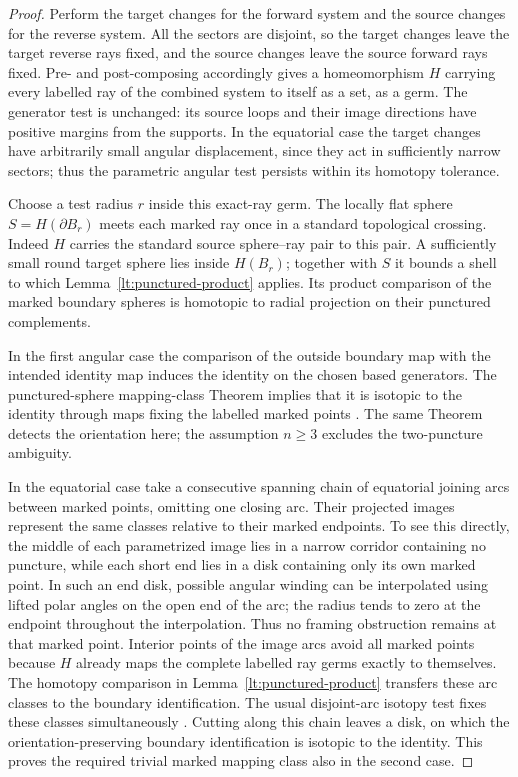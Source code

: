 \documentclass[11pt]{article}
\numberwithin{equation}{section}
\theoremstyle{definition}
\theoremstyle{remark}
\begin{document}
\begin{proof}
Perform the target changes for the forward system and the source
changes for the reverse system.  All the sectors are disjoint, so
the target changes leave the target reverse rays fixed, and the
source changes leave the source forward rays fixed.  Pre- and
post-composing accordingly gives a homeomorphism $H$ carrying every
labelled ray of the combined system to itself as a set, as a germ.
The generator test is unchanged: its source loops and their image
directions have positive margins from the supports.  In the
equatorial case the target changes have arbitrarily small angular
displacement, since they act in sufficiently narrow sectors; thus
the parametric angular test persists within its homotopy tolerance.

Choose a test radius $r$ inside this exact-ray germ.  The locally flat
sphere $S=H(\partial B_r)$ meets each marked ray once in a standard
topological crossing.  Indeed $H$ carries the standard source
sphere--ray pair to this pair.  A sufficiently small round target
sphere lies inside $H(B_r)$; together with $S$ it bounds a shell to
which Lemma~\ref{lt:punctured-product} applies.  Its product comparison
of the marked boundary spheres is homotopic to radial projection on
their punctured complements.

In the first angular case the comparison of the outside boundary map
with the intended identity map induces the identity on the chosen
based generators.  The punctured-sphere mapping-class Theorem implies
that it is isotopic to the identity through maps fixing the labelled
marked points \cite[Theorem~8.8]{FarbMargalit2012}.
The same Theorem detects the orientation here; the
assumption $n\geq3$ excludes the two-puncture ambiguity.

In the equatorial case take a consecutive spanning chain of equatorial
joining arcs between marked points, omitting one closing arc. Their
projected images represent the same
classes relative to their marked endpoints.  To see this directly,
the middle of each parametrized image lies in a narrow corridor
containing no puncture, while each short end lies in a disk containing
only its own marked point.  In such an end disk, possible angular
winding can be interpolated using lifted polar angles on the open
end of the arc; the radius tends to zero at the endpoint throughout
the interpolation.  Thus no framing obstruction remains at that
marked point.  Interior points of the image arcs avoid all marked
points because $H$ already maps the complete labelled ray germs
exactly to themselves.  The homotopy comparison in
Lemma~\ref{lt:punctured-product} transfers these arc classes to the
boundary identification.  The usual disjoint-arc isotopy test fixes
these classes simultaneously
\cite[Section~1.2.7, Proposition~2.8, and Lemma~2.9]{FarbMargalit2012}.
Cutting along this chain leaves a disk,
on which the orientation-preserving boundary identification is
isotopic to the identity.  This proves the required trivial marked
mapping class also in the second case.


\end{proof}
\end{document}
